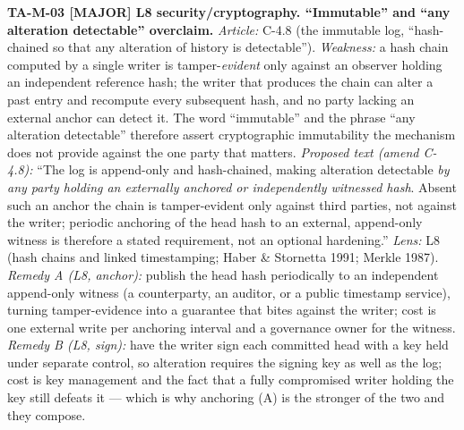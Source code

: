 \documentclass[11pt,a4paper]{article}
\newcommand{\sev}[1]{\textbf{[#1]}}
\newcommand{\lens}[1]{\textnormal{#1}}
\newcommand{\finding}[1]{\medskip\noindent\textbf{#1}}
\begin{document}
\finding{TA-M-03 \sev{MAJOR} \lens{L8 security/cryptography}. ``Immutable'' and ``any
alteration detectable'' overclaim.}
\emph{Article:} C-4.8 (the immutable log, ``hash-chained so that any alteration of history is
detectable''). \emph{Weakness:} a hash chain computed by a single writer is
tamper-\emph{evident} only against an observer holding an independent reference hash; the writer
that produces the chain can alter a past entry and recompute every subsequent hash, and no party
lacking an external anchor can detect it. The word ``immutable'' and the phrase ``any alteration
detectable'' therefore assert cryptographic immutability the mechanism does not provide against
the one party that matters. \emph{Proposed text (amend C-4.8):} ``The log is append-only and
hash-chained, making alteration detectable \emph{by any party holding an externally anchored or
independently witnessed hash}. Absent such an anchor the chain is tamper-evident only against
third parties, not against the writer; periodic anchoring of the head hash to an external,
append-only witness is therefore a stated requirement, not an optional hardening.'' \emph{Lens:}
L8 (hash chains and linked timestamping; Haber \& Stornetta 1991; Merkle 1987). \emph{Remedy A
(L8, anchor):} publish the head hash periodically to an independent append-only witness (a
counterparty, an auditor, or a public timestamp service), turning tamper-evidence into a
guarantee that bites against the writer; cost is one external write per anchoring interval and a
governance owner for the witness. \emph{Remedy B (L8, sign):} have the writer sign each committed
head with a key held under separate control, so alteration requires the signing key as well as
the log; cost is key management and the fact that a fully compromised writer holding the key
still defeats it --- which is why anchoring (A) is the stronger of the two and they compose.
\end{document}
